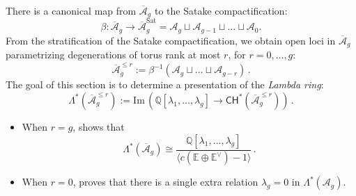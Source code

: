 \documentclass[11pt]{article}
\def\CH{\mathsf{CH}}
\def\EE{\mathbb{E}}
\def\QQ{\mathbb{Q}}
\def\im{\mathrm{Im}\,}
\theoremstyle{definition}
\begin{document}
There is a canonical map from $\overline{\mathcal A}_g$ to the Satake compactification:
$$
\beta : \overline{\mathcal A}_g \to \overline{\mathcal A}_g^{\mathrm{Sat}} = \mathcal A_g \sqcup \mathcal A_{g-1} \sqcup \ldots \sqcup \mathcal A_0.
$$
From the stratification of the Satake compactification, we obtain open loci in $\overline{\mathcal{A}}_g$ parametrizing degenerations
of torus rank at most $r$, for $r=0, \ldots , g$:
$$
\overline{\mathcal A}_g^{\leq r} := \beta^{-1}(\mathcal A_g \sqcup \ldots \sqcup \mathcal A_{g-r})\,.
$$
The goal of this section is to determine a presentation of the \emph{Lambda ring}:
$$
\Lambda^*(\overline{\mathcal A}_g^{\leq r}) :=\im \left(\QQ[\lambda_1, \ldots , \lambda_g] \to \CH^*(\overline{\mathcal A}_g^{\leq r})\right)\,.
$$
\begin{itemize}
	\item When $r=g$, \cite[Section 5]{vdGcoh} shows that
		\begin{equation}\label{eq:Lambdabarring}
			\Lambda^*(\overline{\mathcal A}_g) \cong\frac{\QQ[\lambda_1, \ldots , \lambda_g]}{\langle c(\EE\oplus \EE^\vee)-1\rangle }\,.
		\end{equation}
	\item When $r=0$, \cite[Theorem 1.5]{vdG99} proves that there is a single extra relation $\lambda_g=0$ in $\Lambda^{\ast}(\mathcal{A}_g)$.
\end{itemize}
\end{document}
